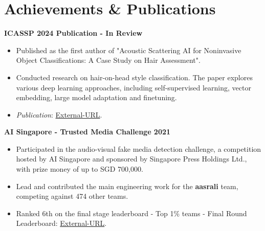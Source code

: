 \section{Achievements \& Publications}
\vspace{-2mm}
\begin{multicols}{1}
    \begin{flushleft}
        \textbf{ICASSP 2024 Publication - In Review}
    \end{flushleft}
\end{multicols}

\vspace{-5mm}

\begin{itemize}[noitemsep,leftmargin=*]
    \item Published as the first author of "Acoustic Scattering AI for Noninvasive Object Classifications: A Case Study on Hair Assessment". 
    \item Conducted research on hair-on-head style classification. The paper explores various deep learning approaches, including self-supervised learning, vector embedding, large model adaptation and finetuning.
    \item \emph{Publication}: \href{https://cmsworkshops.com/ICASSP2024/Papers/Uploads/Proposals/PaperNum/3237/20230914045939_141442_3237.pdf}{External-URL}.
\end{itemize}

\begin{multicols}{1}
    \begin{flushleft}
        \textbf{AI Singapore - Trusted Media Challenge 2021}
    \end{flushleft}
\end{multicols}

\vspace{-5mm}

\begin{itemize}[noitemsep,leftmargin=*]
    \item Participated in the audio-visual fake media detection challenge, a competition hosted by AI Singapore and sponsored by Singapore Press Holdings Ltd., with prize money of up to SGD 700,000.
    \item Lead and contributed the main engineering work for the \textbf{aasrali} team, competing against 474 other teams.
    \item Ranked 6th on the final stage leaderboard - Top 1\% teams - Final Round Leaderboard: \href{https://trustedmedia.aisingapore.org/competition/aisg/final-leaderboard/}{External-URL}.
\end{itemize}

